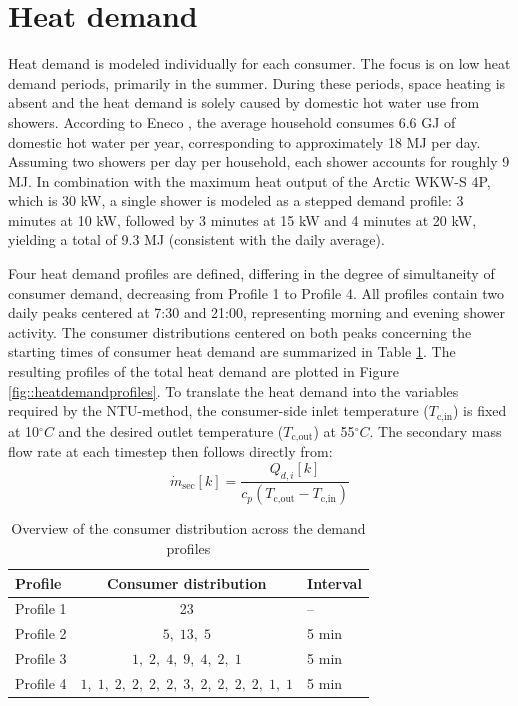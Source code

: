 \section{Heat demand}\label{sec::heatdemand}
Heat demand is modeled individually for each consumer. The focus is on low heat demand periods, primarily in the summer. During these periods, space heating is absent and the heat demand is solely caused by domestic hot water use from showers. According to Eneco \cite{eneco_energieverbruik}, the average household consumes 6.6 GJ of domestic hot water per year, corresponding to approximately 18 MJ per day. Assuming two showers per day per household, each shower accounts for roughly 9 MJ. In combination with the maximum heat output of the Arctic WKW-S 4P, which is 30 kW, a single shower is modeled as a stepped demand profile: 3 minutes at 10 kW, followed by 3 minutes at 15 kW and 4 minutes at 20 kW, yielding a total of 9.3 MJ (consistent with the daily average). 

Four heat demand profiles are defined, differing in the degree of simultaneity of consumer demand, decreasing from Profile 1 to Profile 4. All profiles contain two daily peaks centered at 7:30 and 21:00, representing morning and evening shower activity. The consumer distributions centered on both peaks concerning the starting times of consumer heat demand are summarized in Table \ref{tab::simulprofile}. The resulting profiles of the total heat demand are plotted in Figure \ref{fig::heatdemandprofiles}. To translate the heat demand into the variables required by the NTU-method, the consumer-side inlet temperature ($T_{\text{c,in}}$) is fixed at 10$^{\circ}C$ and the desired outlet temperature ($T_{\text{c,out}}$) at 55$^{\circ}C$. The secondary mass flow rate at each timestep then follows directly from:
\begin{equation}
\dot{m}_{\text{sec}}[k] = \frac{Q_{d,i}[k]}{c_p (T_{\text{c,out}} -T_{\text{c,in}})}
\end{equation}
\noindent 

\begin{table}[h]
\centering
\caption{Overview of the consumer distribution across the demand profiles}
\label{tab::simulprofile}
\begin{tabular}{lcl}
\hline
\textbf{Profile} & \textbf{Consumer distribution} & \textbf{Interval} \\
\hline
Profile 1 & 23 & -- \\
Profile 2 & $5,\;13,\;5$ & 5 min \\
Profile 3 & $1,\;2,\;4,\;9,\;4,\;2,\;1$ & 5 min \\
Profile 4 & $1,\;1,\;2,\;2,\;2,\;2,\;3,\;2,\;2,\;2,\;2,\;1,\;1$ & 5 min \\
\hline
\end{tabular}
\end{table}

